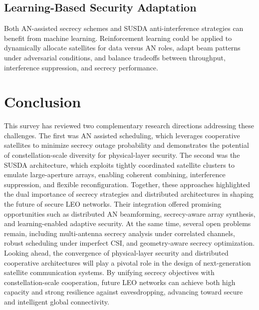 \documentclass[conference]{IEEEtran}
\begin{document}
\subsection{Learning-Based Security Adaptation} \label{sec5.5}
Both AN-assisted secrecy schemes and SUSDA anti-interference strategies can benefit from machine learning. Reinforcement learning could be applied to dynamically allocate satellites for data versus AN roles, adapt beam patterns under adversarial conditions, and balance tradeoffs between throughput, interference suppression, and secrecy performance.


\section{Conclusion} \label{sec6}
This survey has reviewed two complementary research directions addressing these challenges. The first was AN assisted scheduling, which leverages cooperative satellites to minimize secrecy outage probability and demonstrates the potential of constellation-scale diversity for physical-layer security. The second was the SUSDA architecture, which exploits tightly coordinated satellite clusters to emulate large-aperture arrays, enabling coherent combining, interference suppression, and flexible reconfiguration. Together, these approaches highlighted the dual importance of secrecy strategies and distributed architectures in shaping the future of secure LEO networks. Their integration offered promising opportunities such as distributed AN beamforming, secrecy-aware array synthesis, and learning-enabled adaptive security. At the same time, several open problems remain, including multi-antenna secrecy analysis under correlated channels, robust scheduling under imperfect CSI, and geometry-aware secrecy optimization. Looking ahead, the convergence of physical-layer security and distributed cooperative architectures will play a pivotal role in the design of next-generation satellite communication systems. By unifying secrecy objectives with constellation-scale cooperation, future LEO networks can achieve both high capacity and strong resilience against eavesdropping, advancing toward secure and intelligent global connectivity.





\end{document}
